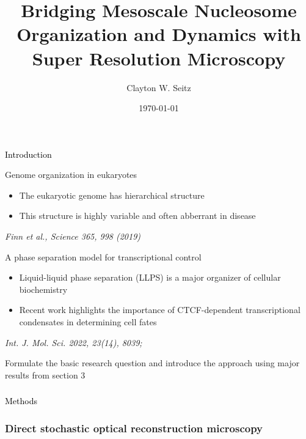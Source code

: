 \documentclass{beamer}					%
\title{Bridging Mesoscale Nucleosome Organization and Dynamics with Super Resolution Microscopy}	%
\author{Clayton W. Seitz}								%
\date{\today}									%
\begin{document}
\begin{frame}
  \titlepage
\end{frame}


%


\begin{frame}
\frametitle{}
\centering
\Large \textcolor{black}{Introduction}
\end{frame}


\begin{frame}{Genome organization in eukaryotes}
\begin{itemize}
\item The eukaryotic genome has hierarchical structure
\item This structure is highly variable and often abberrant in disease
\end{itemize}

\textit{Finn et al., Science 365, 998 (2019)}
\end{frame}

\begin{frame}{A phase separation model for transcriptional control}
\begin{itemize}
\item Liquid-liquid phase separation (LLPS) is a major organizer of cellular biochemistry
\item Recent work highlights the importance of CTCF-dependent transcriptional condensates in determining cell fates
\end{itemize}

\textit{Int. J. Mol. Sci. 2022, 23(14), 8039;}
\end{frame}

\begin{frame}{}
Formulate the basic research question and introduce the approach using major results from section 3
\end{frame}

\begin{frame}
\frametitle{}
\centering
\Large \textcolor{black}{Methods}
\end{frame}



\begin{frame}
\frametitle{Direct stochastic optical reconstruction microscopy}

\end{frame}
\end{document}
